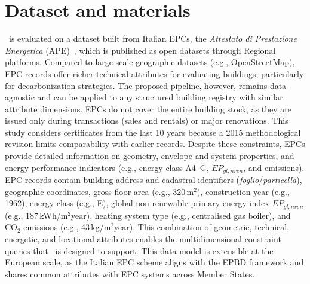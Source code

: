 \documentclass[runningheads,orivec]{llncs}
\begin{document}
\section{Dataset and materials}
\label{sec:dataset}

\methodACR\ is evaluated on a dataset built from Italian EPCs, the \textit{Attestato di Prestazione Energetica} (APE)~\cite{italy_dl63_2013}, which is published as open datasets through Regional platforms. 
Compared to large-scale geographic datasets (e.g., OpenStreetMap), EPC records offer richer technical attributes for evaluating buildings, particularly for decarbonization strategies. The proposed pipeline, however, remains data-agnostic and can be applied to any structured building registry with similar attribute dimensions.
EPCs do not cover the entire building stock, as they are issued only during transactions (sales and rentals) or major renovations. This study considers certificates from the last 10 years because a 2015 methodological revision limits comparability with earlier records. Despite these constraints, EPCs provide detailed information on geometry, envelope and system properties, and energy performance indicators (e.g., energy class A4--G, $EP_{gl,nren}$, and emissions). EPC records contain building address and cadastral identifiers (\textit{foglio}/\textit{particella}), geographic coordinates, gross floor area (e.g., 320\,m$^2$), construction year (e.g., 1962), energy class (e.g., E), global non-renewable primary energy index $EP_{gl,nren}$ (e.g., 187\,kWh/m$^2$year), heating system type (e.g., centralised gas boiler), and $\mathrm{CO_2}$ emissions (e.g., 43\,kg/m$^2$year).
This combination of geometric, technical, energetic, and locational attributes enables the multidimensional constraint queries that \methodACR\ is designed to support.
This data model is extensible at the European scale, as the Italian EPC scheme aligns with the EPBD framework and shares common attributes with EPC systems across Member States.
\end{document}
